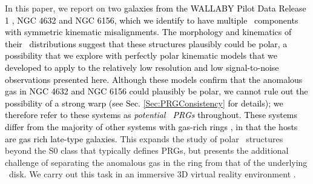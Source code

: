 \documentclass[fleqn,usenatbib]{mnras}
\newcommand{\hi}{\text{H\,\sc{i}}}
\newcommand{\KS}[1]{\textcolor{black}{#1}}
\begin{document}
In this paper, we report on two \textcolor{black}{galaxies from the WALLABY Pilot Data Release 1 \citep[PDR1,][]{SoFiARelease}, NGC 4632 and NGC 6156, \KS{which we identify to have} multiple \hi\ components with symmetric kinematic misalignments.  The morphology and kinematics of their \hi\ distributions suggest that these structures plausibly could be polar, a possibility that we explore with \KS{perfectly polar kinematic models that we developed to apply to the relatively low resolution and low signal-to-noise observations presented here. Although these models confirm that the anomalous gas in NGC 4632 and NGC 6156 could plausibly be polar, we cannot rule out the possibility of a strong warp (see Sec. \ref{Sec:PRGConsistency} for details); we therefore refer to these systems as \textit{potential \hi\ PRGs} throughout.}} \textcolor{black}{These systems differ from the majority of other systems with gas-rich rings \citep[e.g.][]{vanGorkom87,Serra2012,DeRijcke2013,Bait2020}, in that the hosts are gas rich late-type galaxies. }  This  expands the study of polar \hi\ structures beyond the S0 class that typically defines PRGs, but presents the additional challenge of separating the anomalous gas in the ring from that of the underlying \hi\ disk. We carry out this task in an immersive 3D virtual reality environment \citep{jarrett+21}. 
\end{document}
